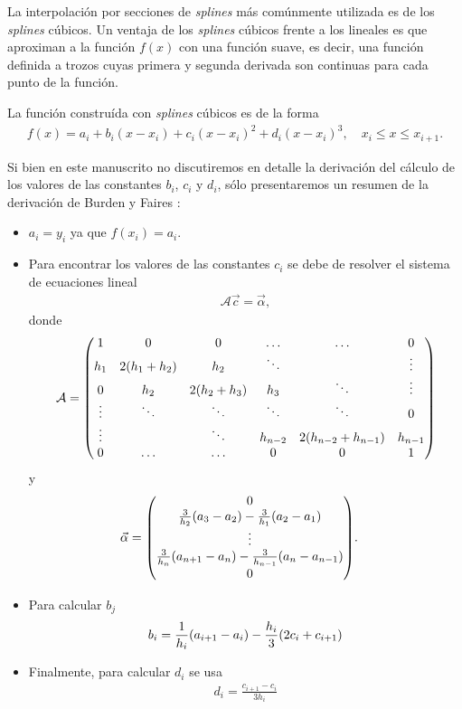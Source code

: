 \documentclass[11pt,letterpaper]{article}
\begin{document}
La interpolación por secciones de \textit{splines} más comúnmente utilizada
es de los \textit{splines} cúbicos. Un ventaja de los \textit{splines} cúbicos frente
a los lineales es que aproximan a la función $f(x)$ con una función suave, es decir,
una función definida a trozos cuyas primera y segunda derivada son continuas 
para cada punto de la función.

La función construída con \textit{splines} cúbicos es de la forma
\begin{align}
f(x)=a_i+b_i(x-x_i)+c_i(x-x_i)^2+d_i(x-x_i)^3,\quad x_i\leq x\leq x_{i+1}.
\end{align}

Si bien en este manuscrito no discutiremos en detalle la derivación del
cálculo de los valores de las constantes $b_i$, $c_i$ y $d_i$, sólo presentaremos
un resumen de la derivación de Burden y Faires \cite{burden2015numerical}:
\begin{itemize}
\item $a_i=y_i$ ya que $f(x_i)=a_i$.
\item Para encontrar los valores de las constantes $c_i$ se debe de resolver 
el sistema de ecuaciones lineal
\begin{align}
\mathcal{A}\vec c=\vec \alpha,
\end{align}
donde 
\begin{align}\label{eq:A_y_b_cubic_spine}
\mathcal{A}&=
\mqty(
1&0&0&\ldots&\ldots&0\\
h_1&2(h_1+h_2)&h_2&\ddots&&\vdots\\
0&h_2&2(h_2+h_3)&h_3&\ddots&\vdots\\
\vdots&\ddots&\ddots&\ddots&\ddots&0\\
\vdots&&\ddots&h_{n-2}&2(h_{n-2}+h_{n-1})&h_{n-1}\\
0&\ldots&\ldots&0&0&1
)\\
\end{align}
y
\begin{align}
\vec \alpha&=
\mqty(
0\\
\frac{3}{h_2}\qty(a_3-a_2)-\frac{3}{h_1}\qty(a_2-a_1)\\
\vdots\\
\frac{3}{h_n}\qty(a_{n+1}-a_{n})-\frac{3}{h_{n-1}}\qty(a_{n}-a_{n-1})\\
0
).
\end{align}
\item Para calcular $b_j$
\begin{align}
b_i=\frac{1}{h_i}\qty(a_{i+1}-a_i)-\frac{h_i}{3}\qty(2c_i+c_{i+1})
\end{align}
\item Finalmente, para calcular $d_i$ se usa
\begin{align}
d_i=\frac{c_{i+1}-c_i}{3h_i}
\end{align}
\end{itemize}
\end{document}
